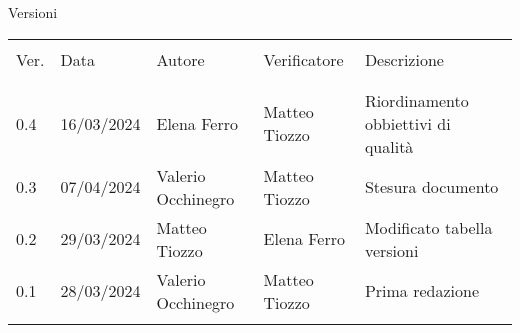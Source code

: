 \documentclass[italian,12pt]{article} %
\begin{document}


\newpage



\captionsetup[table]{list=no}

\begin{table}[!h]
	\begin{center}
		Versioni\\
		\vspace{0.5cm}
		\begin{tabular}{ l l l l l }
			\hline                                                                                       \\[-2ex]
			Ver. & Data       & Autore             & Verificatore  & Descrizione                         \\
			\\[-2ex] \hline \\[-1.5ex]

			0.4  & 16/03/2024 & Elena Ferro        & Matteo Tiozzo & Riordinamento obbiettivi di qualità \\
			0.3  & 07/04/2024 & Valerio Occhinegro & Matteo Tiozzo & Stesura documento                   \\
			0.2  & 29/03/2024 & Matteo Tiozzo      & Elena Ferro              & Modificato tabella versioni         \\
			0.1  & 28/03/2024 & Valerio Occhinegro & Matteo Tiozzo & Prima redazione                     \\
			\\[-1.5ex] \hline
		\end{tabular}
	\end{center}
\end{table}
\captionsetup[table]{list=yes}

\newpage
\tableofcontents
\listoftables
\listoffigures
\newpage









\end{document}
